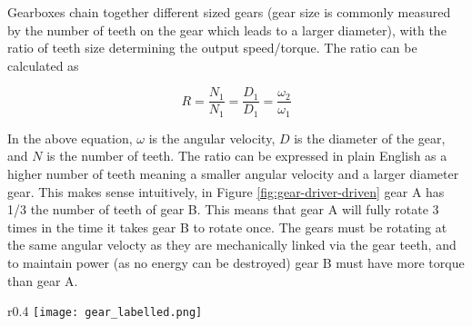 \documentclass[../TinyBot.tex]{subfiles}
\begin{document}
Gearboxes chain together different sized gears (gear size is commonly measured by the number of teeth on the gear which leads to a larger diameter), with the ratio of teeth size determining the output speed/torque. The ratio can be calculated as 


    
\[ R = \frac{N_1}{N_1} = \frac{D_1}{D_1} = \frac{\omega_2}{\omega_1} \]

In the above equation, $\omega$ is the angular velocity, $D$ is the diameter of the gear, and $N$ is the number of teeth. The ratio can be expressed in plain English as a higher number of teeth meaning a smaller angular velocity and a larger diameter gear. This makes sense intuitively, in Figure \ref{fig:gear-driver-driven} gear A has 1/3 the number of teeth of gear B. This means that gear A will fully rotate 3 times in the time it takes gear B to rotate once. The gears must be rotating at the same angular velocty as they are mechanically linked via the gear teeth, and to maintain power (as no energy can be destroyed) gear B must have more torque than gear A. 

\begin{wrapfigure}{r}{0.4\textwidth}
    \texttt{[image: gear\_labelled.png]}
        \label{fig:gear-driver-driven}
\end{wrapfigure}



\end{document}
